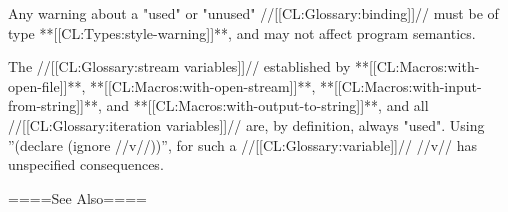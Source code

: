 Any warning about a "used" or "unused" //[[CL:Glossary:binding]]// must be of type **[[CL:Types:style-warning]]**, and may not affect program semantics.

The //[[CL:Glossary:stream variables]]// established by **[[CL:Macros:with-open-file]]**, **[[CL:Macros:with-open-stream]]**, **[[CL:Macros:with-input-from-string]]**, and **[[CL:Macros:with-output-to-string]]**, and all //[[CL:Glossary:iteration variables]]// are, by definition, always "used". Using ''(declare (ignore //v//))'', for such a //[[CL:Glossary:variable]]// //v// has unspecified consequences.

====See Also====


  
